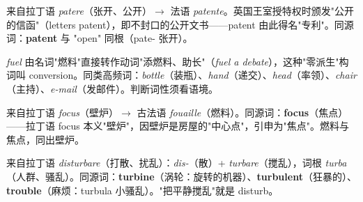 \documentclass[../main.tex]{subfiles}
\begin{document}
\begin{origin}
来自拉丁语 \textit{patere}（张开、公开）$\to$ 法语 \textit{patente}。英国王室授特权时颁发"公开的信函"（letters patent），即不封口的公开文书——patent 由此得名"专利"。同源词：\textbf{patent} 与 "open" 同根（pate- 张开）。
\end{origin}





\begin{gram}
\textit{fuel} 由名词"燃料"直接转作动词"添燃料、助长"（\textit{fuel a debate}），这种"零派生"构词叫 conversion。同类高频词：\textit{bottle}（装瓶）、\textit{hand}（递交）、\textit{head}（率领）、\textit{chair}（主持）、\textit{e-mail}（发邮件）。判断词性须看语境。
\end{gram}

\begin{origin}
来自拉丁语 \textit{focus}（壁炉）$\to$ 古法语 \textit{fouaille}（燃料）。同源词：\textbf{focus}（焦点）——拉丁语 focus 本义"壁炉"，因壁炉是房屋的"中心点"，引申为"焦点"。燃料与焦点，同出壁炉。
\end{origin}





\begin{origin}
来自拉丁语 \textit{disturbare}（打散、扰乱）：\textit{dis-}（散）+ \textit{turbare}（搅乱），词根 \textit{turba}（人群、骚乱）。同源词：\textbf{turbine}（涡轮：旋转的机器）、\textbf{turbulent}（狂暴的）、\textbf{trouble}（麻烦：turbula 小骚乱）。"把平静搅乱"就是 disturb。
\end{origin}
\end{document}
